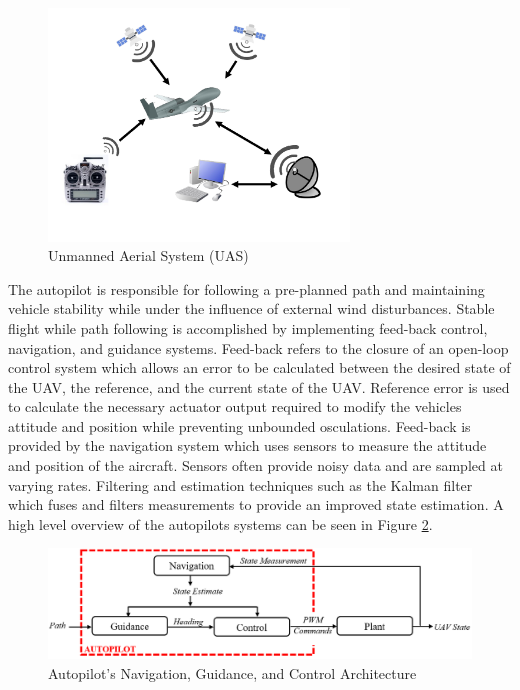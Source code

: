 \documentclass[numbered,pdftex]{ohio-etd}
\begin{document}
\begin{figure}
	\centering
	\includegraphics[width=8cm]{PaperFigures/UAS}
	\caption{Unmanned Aerial System (UAS)}
	\label{fig:uas}
\end{figure}

The autopilot is responsible for following a pre-planned path and maintaining vehicle stability while under the influence of external wind disturbances. Stable flight while path following is accomplished by implementing feed-back control, navigation, and guidance systems. Feed-back refers to the closure of an open-loop control system which allows an error to be calculated between the desired state of the UAV, the reference, and the current state of the UAV. Reference error is used to calculate the necessary actuator output required to modify the vehicles attitude and position while preventing unbounded osculations. Feed-back is provided by the navigation system which uses sensors to measure the attitude and position of the aircraft. Sensors often provide noisy data and are sampled at varying rates. Filtering and estimation techniques such as the Kalman filter which fuses and filters measurements to provide an improved state estimation. A high level overview of the autopilots systems can be seen in Figure \ref{fig:autopilotloops}.

\begin{figure}
	\centering
	\includegraphics[width=15cm]{PaperFigures/autopilotLoops}
	\caption{Autopilot's Navigation, Guidance, and Control Architecture}
	\label{fig:autopilotloops}
\end{figure}
\end{document}
